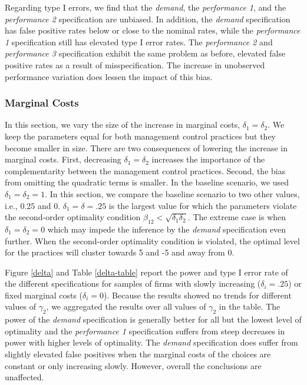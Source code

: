 \documentclass[12pt]{article}
\begin{document}
Regarding type I errors, we find that the \emph{demand}, the \emph{performance 1}, and the \emph{performance 2} specification are unbiased. In addition, the \emph{demand} specification has false positive rates below or close to the nominal rates, while the \emph{performance 1} specification still has elevated type I error rates. The \emph{performance 2} and \emph{performance 3} specification exhibit the same problem as before, elevated false positive rates as a result of misspecification. The increase in unobserved performance variation does lessen the impact of this bias. 

\subsubsection{Marginal Costs}\label{marginal-cost}
 
In this section, we vary the size of the increase in marginal costs, $\delta_1 = \delta_2$. We keep the parameters equal for both management control practices but they become smaller in size. There are two consequences of lowering the increase in marginal costs. First, decreasing $\delta_1 = \delta_2$ increases the importance of the complementarity between the management control practices. Second, the bias from omitting the quadratic terms is smaller. In the baseline scenario, we used $\delta_1 = \delta_2 = 1$. In this section, we compare the baseline scenario to two other values, i.e., $0.25$ and $0$. $\delta_1 = \delta = .25$ is the largest value for which the parameters violate the second-order optimality condition $\beta_{12} < \sqrt{\delta_1 \delta_2}$. The extreme case is when $\delta_1 = \delta_2 = 0$ which may impede the inference by the \emph{demand} specification even further. When the second-order optimality condition is violated, the optimal level for the practices will cluster towards 5 and -5 and away from  0. 

Figure \ref{delta} and Table \ref{delta-table} report the power and type I error rate of the different specifications for samples of firms with slowly increasing ($\delta_i = .25$) or fixed marginal costs ($\delta_i = 0$). Because the results showed no trends for different values of $\gamma_2$, we aggregated the results over all values of $\gamma_2$ in the table. The power of the \emph{demand} specification is generally better for all but the lowest level of optimality and the \emph{performance 1} specification suffers from steep decreases in power with higher levels of optimality. The \emph{demand} specification does suffer from slightly elevated false positives when the marginal costs of the choices are constant or only increasing slowly. However, overall the conclusions are unaffected.
\end{document}
